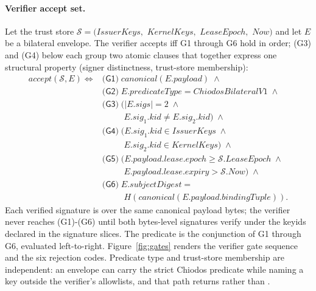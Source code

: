 \paragraph{Verifier accept set.} Let the trust store
$\mathcal{S} = (\mathit{IssuerKeys},$
$\mathit{KernelKeys},$
$\mathit{LeaseEpoch},$
$\mathit{Now})$
and let $E$ be a bilateral envelope. The verifier accepts iff G1 through G6 hold in order; (G3) and (G4) below each group two atomic clauses that together express one structural property (signer distinctness, trust-store membership):
\begin{align*}
  \mathit{accept}(\mathcal{S},E) \iff{}
  & \textsf{(G1)}\;\mathit{canonical}(E.\mathit{payload}) \;\wedge \\
  & \textsf{(G2)}\;E.\mathit{predicateType} = \mathit{ChiodosBilateralV1} \;\wedge \\
  & \textsf{(G3)}\;\bigl(|E.\mathit{sigs}|=2 \;\wedge \\
  & \qquad\;\; E.\mathit{sig}_1.\mathit{kid} \ne E.\mathit{sig}_2.\mathit{kid}\bigr) \;\wedge \\
  & \textsf{(G4)}\;\bigl(E.\mathit{sig}_1.\mathit{kid} \in \mathit{IssuerKeys}\;\wedge \\
  & \qquad\;\; E.\mathit{sig}_2.\mathit{kid} \in \mathit{KernelKeys}\bigr) \;\wedge \\
  & \textsf{(G5)}\;\bigl(E.\mathit{payload}.\mathit{lease}.\mathit{epoch} \ge \mathcal{S}.\mathit{LeaseEpoch} \;\wedge \\
  & \qquad\;\; E.\mathit{payload}.\mathit{lease}.\mathit{expiry} > \mathcal{S}.\mathit{Now}\bigr) \;\wedge \\
  & \textsf{(G6)}\;E.\mathit{subjectDigest} = \\
  & \qquad\;\; H(\mathit{canonical}(E.\mathit{payload}.\mathit{bindingTuple})).
\end{align*}
Each verified signature is over the same canonical payload bytes; the verifier never reaches (G1)-(G6) until both bytes-level signatures verify under the keyids declared in the signature slices. The predicate is the conjunction of G1 through G6, evaluated left-to-right. Figure~\ref{fig:gates} renders the verifier gate sequence and the six rejection codes. Predicate type and trust-store membership are independent: an envelope can carry the strict Chiodos predicate while naming a key outside the verifier's allowlists, and that path returns  rather than .

